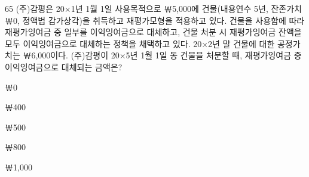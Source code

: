 \begin{question}{65}
(주)감평은 20×1년 1월 1일 사용목적으로 ￦5,000에 건물(내용연수 5년, 잔존가치 ￦0, 정액법 감가상각)을 취득하고 재평가모형을 적용하고 있다. 건물을 사용함에 따라 재평가잉여금 중 일부를 이익잉여금으로 대체하고, 건물 처분 시 재평가잉여금 잔액을 모두 이익잉여금으로 대체하는 정책을 채택하고 있다. 20×2년 말 건물에 대한 공정가치는 ￦6,000이다. (주)감평이 20×5년 1월 1일 동 건물을 처분할 때, 재평가잉여금 중 이익잉여금으로 대체되는 금액은?
\begin{choices}
  \item ￦0
  \item ￦400
  \item ￦500
  \item ￦800
  \item ￦1,000
\end{choices}
\end{question}
